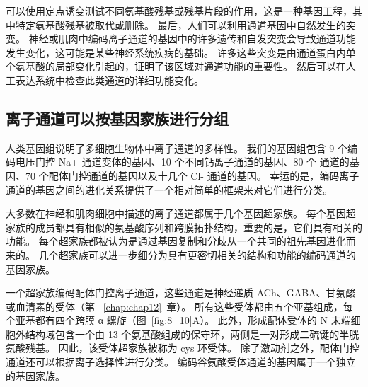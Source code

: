 可以使用定点诱变测试不同氨基酸残基或残基片段的作用，这是一种基因工程，其中特定氨基酸残基被取代或删除。
最后，人们可以利用通道基因中自然发生的突变。
神经或肌肉中编码离子通道的基因中的许多遗传和自发突变会导致通道功能发生变化，这可能是某些神经系统疾病的基础。
许多这些突变是由通道蛋白内单个氨基酸的局部变化引起的，证明了该区域对通道功能的重要性。
然后可以在人工表达系统中检查此类通道的详细功能变化。



\subsection{离子通道可以按基因家族进行分组}

人类基因组说明了多细胞生物体中离子通道的多样性。 我们的基因组包含 9 个编码电压门控 Na+ 通道变体的基因、10 个不同钙离子通道的基因、80 个  通道的基因、70 个配体门控通道的基因以及十几个 Cl- 通道的基因。
幸运的是，编码离子通道的基因之间的进化关系提供了一个相对简单的框架来对它们进行分类。


大多数在神经和肌肉细胞中描述的离子通道都属于几个基因超家族。
每个基因超家族的成员都具有相似的氨基酸序列和跨膜拓扑结构，重要的是，它们具有相关的功能。
每个超家族都被认为是通过基因复制和分歧从一个共同的祖先基因进化而来的。
几个超家族可以进一步细分为具有更密切相关的结构和功能的编码通道的基因家族。


一个超家族编码配体门控离子通道，这些通道是神经递质 ACh、GABA、甘氨酸或血清素的受体（第 ~\ref{chap:chap12}~章）。 
所有这些受体都由五个亚基组成，每个亚基都有四个跨膜 α 螺旋（图~\ref{fig:8_10}A）。 
此外，形成配体受体的 N 末端细胞外结构域包含一个由 13 个氨基酸组成的保守环，两侧是一对形成二硫键的半胱氨酸残基。
因此，该受体超家族被称为 cys 环受体。
除了激动剂之外，配体门控通道还可以根据离子选择性进行分类。
编码谷氨酸受体通道的基因属于一个独立的基因家族。


